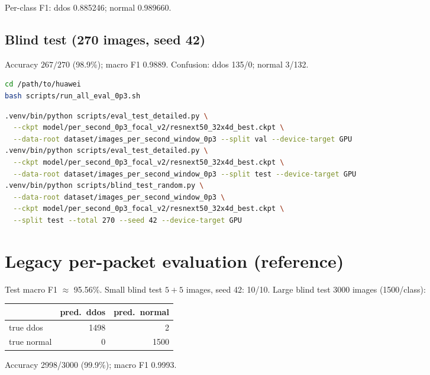 \noindent Per-class F1: ddos 0.885246; normal 0.989660.

\subsection*{Blind test (270 images, seed 42)}
Accuracy $267/270$ (98.9\%); macro F1 0.9889. Confusion: ddos 135/0; normal 3/132.

\begin{lstlisting}[language=bash,caption={Reproduce primary metrics (GPU example)}]
cd /path/to/huawei
bash scripts/run_all_eval_0p3.sh
\end{lstlisting}

\begin{lstlisting}[language=bash,caption={Individual eval calls (adjust venv)}]
.venv/bin/python scripts/eval_test_detailed.py \
  --ckpt model/per_second_0p3_focal_v2/resnext50_32x4d_best.ckpt \
  --data-root dataset/images_per_second_window_0p3 --split val --device-target GPU
.venv/bin/python scripts/eval_test_detailed.py \
  --ckpt model/per_second_0p3_focal_v2/resnext50_32x4d_best.ckpt \
  --data-root dataset/images_per_second_window_0p3 --split test --device-target GPU
.venv/bin/python scripts/blind_test_random.py \
  --data-root dataset/images_per_second_window_0p3 \
  --ckpt model/per_second_0p3_focal_v2/resnext50_32x4d_best.ckpt \
  --split test --total 270 --seed 42 --device-target GPU
\end{lstlisting}

\section{Legacy per-packet evaluation (reference)}
\label{app:legacy}

Test macro F1 $\approx$ 95.56\%. Small blind test $5{+}5$ images, seed 42: 10/10. Large blind test 3000 images (1500/class):

\begin{table}[h]
  \centering
  \begin{tabular}{@{}lrr@{}}
    \toprule
     & pred.\ ddos & pred.\ normal \\
    \midrule
    true ddos & 1498 & 2 \\
    true normal & 0 & 1500 \\
    \bottomrule
  \end{tabular}
\end{table}

\noindent Accuracy 2998/3000 (99.9\%); macro F1 0.9993.

